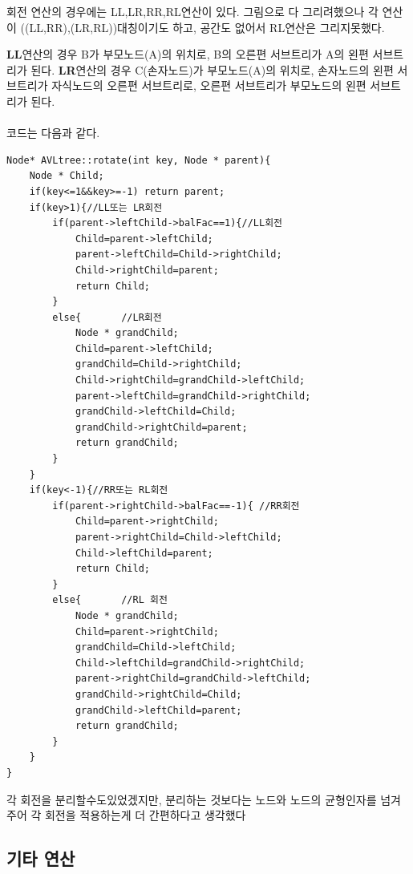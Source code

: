 \documentclass[a4paper,11pt]{article}
\begin{document}
회전 연산의 경우에는 LL,LR,RR,RL연산이 있다. 그림으로 다 그리려했으나 각 연산이 ((LL,RR),(LR,RL))대칭이기도 하고, 공간도 없어서 RL연산은 그리지못했다.

\textbf{LL}연산의 경우 B가 부모노드(A)의 위치로, B의 오른편 서브트리가 A의 왼편 서브트리가 된다. \textbf{LR}연산의 경우 C(손자노드)가 부모노드(A)의 위치로, 손자노드의 왼편 서브트리가 자식노드의 오른편 서브트리로, 오른편 서브트리가 부모노드의 왼편 서브트리가 된다.
\\\\

코드는 다음과 같다.
\begin{Verbatim}
Node* AVLtree::rotate(int key, Node * parent){
    Node * Child;
    if(key<=1&&key>=-1) return parent;
    if(key>1){//LL또는 LR회전
        if(parent->leftChild->balFac==1){//LL회전
            Child=parent->leftChild;
            parent->leftChild=Child->rightChild;
            Child->rightChild=parent;
            return Child;
        }
        else{       //LR회전
            Node * grandChild;
            Child=parent->leftChild;
            grandChild=Child->rightChild;
            Child->rightChild=grandChild->leftChild;
            parent->leftChild=grandChild->rightChild;
            grandChild->leftChild=Child;
            grandChild->rightChild=parent;
            return grandChild;
        }
    }
    if(key<-1){//RR또는 RL회전
        if(parent->rightChild->balFac==-1){ //RR회전
            Child=parent->rightChild;
            parent->rightChild=Child->leftChild;
            Child->leftChild=parent;
            return Child;
        }
        else{       //RL 회전
            Node * grandChild;
            Child=parent->rightChild;
            grandChild=Child->leftChild;
            Child->leftChild=grandChild->rightChild;
            parent->rightChild=grandChild->leftChild;
            grandChild->rightChild=Child;
            grandChild->leftChild=parent;
            return grandChild;
        }
    } 
}
\end{Verbatim}

각 회전을 분리할수도있었겠지만, 분리하는 것보다는 노드와 노드의 균형인자를 넘겨주어 각 회전을 적용하는게 더 간편하다고 생각했다
\subsection{기타 연산}
\end{document}
